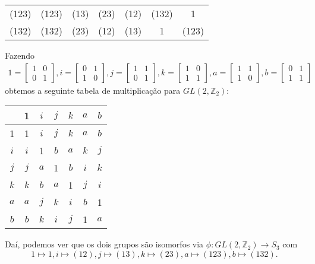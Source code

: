 \begin{example}
\begin{table}[H]
\begin{tabular}{c|cccccc}
			(123) & (123) & (13) & (23) & (12) & (132) & 1 \\
			(132) & (132) & (23) & (12) & (13) & 1 & (123) \\
		\end{tabular}
	\end{table}
	\par \vspace{0.3cm} Fazendo
	\begin{align*}
        1 = \begin{bmatrix}
            1 & 0 \\
            0 & 1
        \end{bmatrix}, 
        i = \begin{bmatrix}
            0 & 1 \\
            1 & 0
        \end{bmatrix}, 
        j = \begin{bmatrix}
            1 & 1 \\
            0 & 1
        \end{bmatrix}, 
        k = \begin{bmatrix}
            1 & 0 \\
            1 & 1
        \end{bmatrix},
        a = \begin{bmatrix}
            1 & 1 \\
            1 & 0
        \end{bmatrix}, 
        b = \begin{bmatrix}
            0 & 1 \\
            1 & 1
        \end{bmatrix}
	\end{align*}
	obtemos a seguinte tabela de multiplicação para $GL(2, \mathbb{Z}_2)$:
	\begin{table}[H]
		\centering
		\noindent\begin{tabular}{c|cccccc}
			& 1 & $i$ & $j$ & $k$ & $a$ & $b$ \\
			\hline
			1 & 1 & $i$ & $j$ & $k$ & $a$ & $b$ \\
			$i$ & $i$ & 1 & $b$ & $a$ & $k$ & $j$ \\
			$j$ & $j$ & $a$ & 1 & $b$ & $i$ & $k$ \\
			$k$ & $k$ & $b$ & $a$ & 1 & $j$ & $i$ \\
			$a$ & $a$ & $j$ & $k$ & $i$ & $b$ & 1 \\
			$b$ & $b$ & $k$ & $i$ & $j$ & 1 & $a$ \\
		\end{tabular}
	\end{table}
	\par\vspace{0.3cm} Daí, podemos ver que os dois grupos são isomorfos 
	via $\phi:GL(2, \mathbb{Z}_2)\to S_3$ com
	\begin{equation*}
	    1\mapsto 1, i\mapsto(12), j\mapsto(13), k\mapsto(23), a\mapsto(123),
	    b\mapsto(132).
	\end{equation*}
	\end{example}
